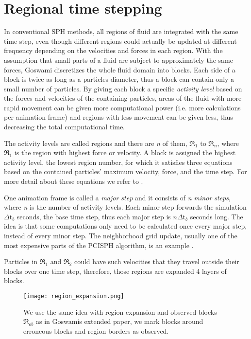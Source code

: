 \documentclass[../../main.tex]{subfiles}
\begin{document}
\section{Regional time stepping}
In conventional SPH methods, all regions of fluid are integrated with the same time step, even though different regions could actually be updated at different frequency depending on the velocities and forces in each region. With the assumption that small parts of a fluid are subject to approximately the same forces, Goswami discretizes the whole fluid domain into blocks. Each side of a block is twice as long as a particles diameter, thus a block can contain only a small number of particles. By giving each block a specific \textit{activity level} based on the forces and velocities of the containing particles, areas of the fluid with more rapid movement can be given more computational power (i.e. more calculations per animation frame) and regions with less movement can be given less, thus decreasing the total computational time. 

The activity levels are called regions and there are \textit{n} of them, $\Re_1$ to $\Re_n$, where $\Re_1$ is the region with highest force or velocity. A block is assigned the highest activity level, the lowest region number, for which it satisfies three equations based on the contained particles' maximum velocity, force, and the time step. For more detail about these equations we refer to \citet{goswami2014regional}.

One animation frame is called a \textit{major step} and it consists of \textit{n minor steps}, where \textit{n} is the number of activity levels. Each minor step forwards the simulation $\Delta$t$_b$ seconds, the base time step, thus each major step is $n\Delta$t$_b$ seconds long. The idea is that some computations only need to be calculated once every major step, instead of every minor step. The neighborhood grid update, usually one of the most expensive parts of the PCISPH algorithm, is an example \citep{solenthaler2011two}. 

Particles in $\Re_1$ and $\Re_2$ could have such velocities that they travel outside their blocks over one time step, therefore, those regions are expanded 4 layers of blocks.

\begin{figure}[h!]
    \centering
    \texttt{[image: region\_expansion.png]}
    \caption[Region expansion for $R_x$]{ We use the same idea with region expansion and observed blocks $\Re_{ob}$ as in Goswamis extended paper, we mark blocks around erroneous blocks and region borders as observed. }
    \label{fig:region_exp}
\end{figure}
\end{document}
